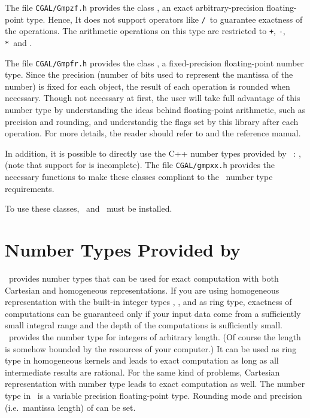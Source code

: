 The file {\tt CGAL/Gmpzf.h} provides the class , an exact
arbitrary-precision floating-point type. Hence, It does not support
operators like \verb=/=\ to guarantee exactness of the operations. The
arithmetic operations on this type are restricted to \verb=+=, \verb=-=,
\verb=*=\ and .

The file {\tt CGAL/Gmpfr.h} provides the class ,
a fixed-precision floating-point number type. Since the precision
(number of bits used to represent the mantissa of the number) is fixed
for each object, the result of each operation is rounded when necessary.
Though not necessary at first, the user will take full advantage of this
number type by understanding the ideas behind floating-point arithmetic,
such as precision and rounding, and understandig the flags set by this
library after each operation.  For more details, the reader should refer
to \cite{cgal:mt-mpfr} and the  reference manual.

In addition, it is possible to directly use the C++ number types provided by
\gmp~: ,  (note that support for
 is incomplete).  The file {\tt CGAL/gmpxx.h} provides the
necessary functions to make these classes compliant to the \cgal\ number type
requirements.

To use these classes, \gmp\ and \mpfr\ must be installed.


\section[Number Types Provided by LEDA] {Number Types Provided by \leda}
\label{leda-nt}

\leda\ provides number types that can be used for exact computation 
with both Cartesian and homogeneous representations.  If you are using
homogeneous representation with the built-in integer types
, , and  as ring type, exactness of
computations can be guaranteed only if your input data come from a
sufficiently small integral range and the depth of the computations is
sufficiently small.  \leda\ provides the number type  for
integers of arbitrary length. (Of course the length is
somehow bounded by the resources of your computer.)  It can be used as
ring type in homogeneous kernels and leads to exact
computation as long as all intermediate results are rational.  For the
same kind of problems, Cartesian representation with number type
 leads to exact computation as well.
The number type  in \leda\ is a variable precision
floating-point type. Rounding mode and precision (i.e.\ mantissa length) of
 can be set. 

